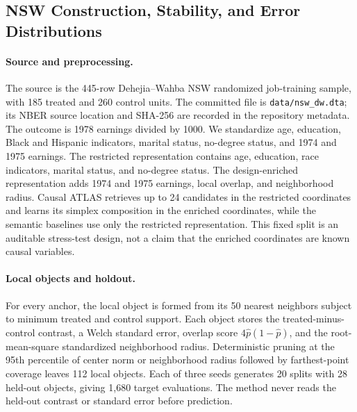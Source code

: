 \documentclass[11pt]{article}
\numberwithin{equation}{section}
\newcommand{\1}{\mathbf 1}
\begin{document}
\subsection{NSW Construction, Stability, and Error Distributions}
\label{app:nsw-details}
\suppressfloats[t]

\paragraph{Source and preprocessing.}
The source is the 445-row Dehejia--Wahba NSW randomized job-training sample, with 185 treated and 260 control units.  The committed file is \texttt{data/nsw\_dw.dta}; its NBER source location and SHA-256 are recorded in the repository metadata.  The outcome is 1978 earnings divided by 1000.  We standardize age, education, Black and Hispanic indicators, marital status, no-degree status, and 1974 and 1975 earnings.  The restricted representation contains age, education, race indicators, marital status, and no-degree status.  The design-enriched representation adds 1974 and 1975 earnings, local overlap, and neighborhood radius.  Causal ATLAS retrieves up to 24 candidates in the restricted coordinates and learns its simplex composition in the enriched coordinates, while the semantic baselines use only the restricted representation.  This fixed split is an auditable stress-test design, not a claim that the enriched coordinates are known causal variables.

\paragraph{Local objects and holdout.}
For every anchor, the local object is formed from its 50 nearest neighbors subject to minimum treated and control support.  Each object stores the treated-minus-control contrast, a Welch standard error, overlap score $4\widehat p(1-\widehat p)$, and the root-mean-square standardized neighborhood radius.  Deterministic pruning at the 95th percentile of center norm or neighborhood radius followed by farthest-point coverage leaves 112 local objects.  Each of three seeds generates 20 splits with 28 held-out objects, giving 1,680 target evaluations.  The method never reads the held-out contrast or standard error before prediction.



\end{document}
